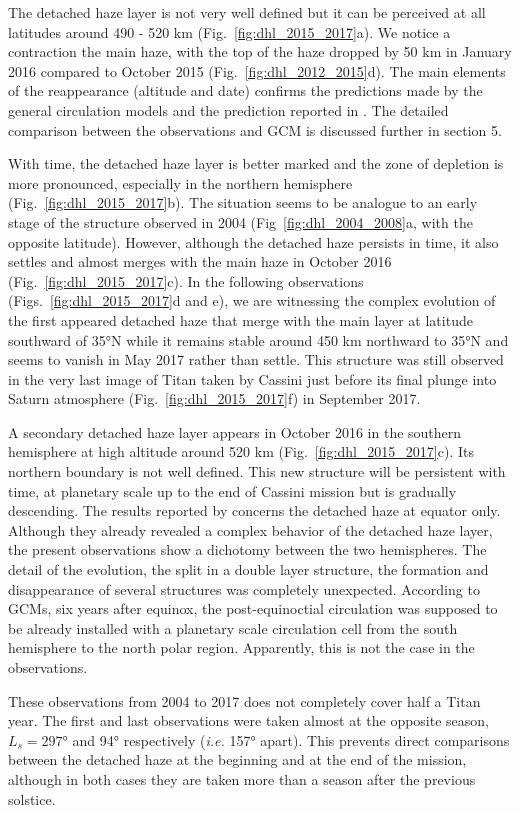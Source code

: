 The detached haze layer is not very well defined but it can be perceived at all latitudes
around 490 - 520 km (Fig.~\ref{fig:dhl_2015_2017}a). We notice a contraction
the main haze, with the top of the haze dropped by 50 km in January 2016 compared to October 2015
(Fig.~\ref{fig:dhl_2012_2015}d). The main elements of the reappearance (altitude and date) confirms the
predictions made by the general circulation models \citep{Lebonnois2012,Larson2015} and the prediction
reported in \cite{West2011}. The detailed comparison between the observations and GCM is discussed further
in section 5.

With time, the detached haze layer is better marked and the zone of depletion is more pronounced, especially in the
northern hemisphere (Fig.~\ref{fig:dhl_2015_2017}b). The situation seems to be analogue to an early stage of
the structure observed in 2004 (Fig~\ref{fig:dhl_2004_2008}a, with the opposite latitude).
However, although the detached haze persists in time,
it also settles and almost merges with the main haze in October 2016 (Fig.~\ref{fig:dhl_2015_2017}c).
In the  following observations (Figs.~\ref{fig:dhl_2015_2017}d and e), we are
witnessing the complex evolution of the first appeared detached haze that merge with the main layer at latitude southward
of \ang{35}N while it remains stable around 450 km northward to \ang{35}N and seems to vanish in May 2017 rather than settle.
This structure was still observed in the very last image of Titan taken by Cassini just before its final plunge into Saturn
atmosphere (Fig.~\ref{fig:dhl_2015_2017}f) in September 2017.

A secondary detached haze layer appears in October 2016 in the southern hemisphere at high altitude around 520 km
(Fig.~\ref{fig:dhl_2015_2017}c). Its northern boundary is not well defined. This new structure will be persistent with
time, at planetary scale up to the end of Cassini mission but is gradually descending. The results reported by \cite{West2018}
concerns the detached haze at equator only. Although they already revealed a complex behavior of the detached haze layer, the
present observations show a dichotomy between the two hemispheres. The detail of the evolution, the split in a double layer
structure, the formation and disappearance of several structures was completely unexpected. According to GCMs, six years
after equinox, the post-equinoctial circulation was supposed to be already installed with a planetary scale circulation cell
from the south hemisphere to the north polar region. Apparently, this is not the case in the observations.

These observations from 2004 to 2017 does not completely cover half a Titan year. The first and last observations
were taken almost at the opposite season, $L_s=\ang{297}$ and \ang{94} respectively (\emph{i.e.} \ang{157} apart).
This prevents direct comparisons between the detached haze at the beginning and at the end of the mission,
although in both cases they are taken more than a season after the previous solstice.
